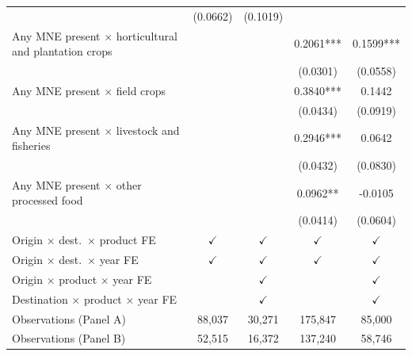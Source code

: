 \begin{tabular}{lcccc}
 & (0.0662) & (0.1019) &  &  \\
Any MNE present $\times$ horticultural and plantation crops &  &  & 0.2061*** & 0.1599*** \\
 &  &  & (0.0301) & (0.0558) \\
Any MNE present $\times$ field crops &  &  & 0.3840*** & 0.1442 \\
 &  &  & (0.0434) & (0.0919) \\
Any MNE present $\times$ livestock and fisheries &  &  & 0.2946*** & 0.0642 \\
 &  &  & (0.0432) & (0.0830) \\
Any MNE present $\times$ other processed food &  &  & 0.0962** & -0.0105 \\
 &  &  & (0.0414) & (0.0604) \\
\hline
Origin $\times$ dest.\ $\times$ product FE & $\checkmark$ & $\checkmark$ & $\checkmark$ & $\checkmark$ \\
Origin $\times$ dest.\ $\times$ year FE & $\checkmark$ & $\checkmark$ & $\checkmark$ & $\checkmark$ \\
Origin $\times$ product $\times$ year FE &  & $\checkmark$ &  & $\checkmark$ \\
Destination $\times$ product $\times$ year FE &  & $\checkmark$ &  & $\checkmark$ \\
Observations (Panel A) & 88,037 & 30,271 & 175,847 & 85,000 \\
Observations (Panel B) & 52,515 & 16,372 & 137,240 & 58,746 \\
\hline
\end{tabular}
